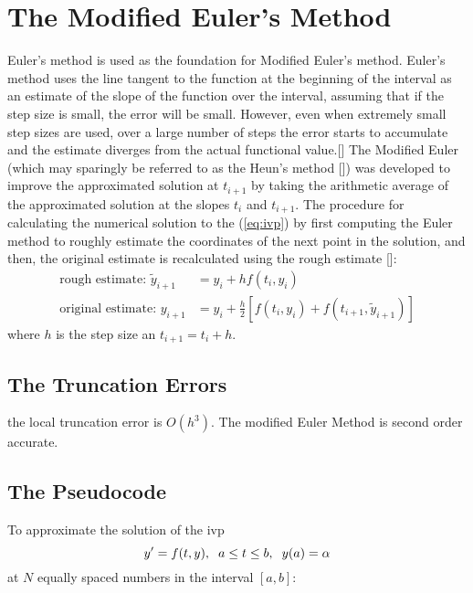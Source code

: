 \documentclass[12pt,oneside]{book}
\begin{document}
	\section{The Modified Euler's Method} \label{m:meul}
		\begin{spacing}{1.2}
			
			Euler's method is used as the foundation for Modified Euler's method. Euler's method uses the line tangent to the function at the beginning of the interval as an estimate of the slope of the function over the interval, assuming that if the step size is small, the error will be small. However, even when extremely small step sizes are used, over a large number of steps the error starts to accumulate and the estimate diverges from the actual functional value.[] \newline
			The Modified Euler (which may sparingly be referred to as the Heun's method []) was developed to improve the approximated solution at $t_{i+1}$ by taking the arithmetic average of the approximated solution at the slopes $t_{i}$ and $t_{i+1}$. \newline
			The procedure for calculating the numerical solution to the (\ref{eq:ivp}) by first computing the Euler method to roughly estimate the coordinates of the next point in the solution, and then, the original estimate is recalculated using the rough estimate []:
				\begin{equation}
					\begin{split}
						\text{rough estimate: } \tilde{y}_{i+1} & = y_{i} + hf(t_{i}, y_{i}) \\
						\text{original estimate: } y_{i+1} & = y_{i} + \frac{h}{2} \left[f(t_{i}, y_{i}) + f(t_{i+1}, \tilde{y}_{i+1}) \right]
					\end{split}
				\end{equation}
				where $ h $ is the step size an $ t_{i+1} = t_{i} + h. $
			
			\subsection*{The Truncation Errors}
				the local truncation error is $ O(h^{3}) $. The modified Euler Method is second order accurate.
			
			\clearpage
			\subsection{The Pseudocode}
				To approximate the solution of the \ac{ivp} 
				\[ y' = f(t,y), \hspace*{0.2cm} a \leq t \leq b, \hspace*{0.2cm} y(a) = \alpha \]
				at $ N $ equally spaced numbers in the interval $ [a, b]: $
				

\end{spacing}
\end{document}
